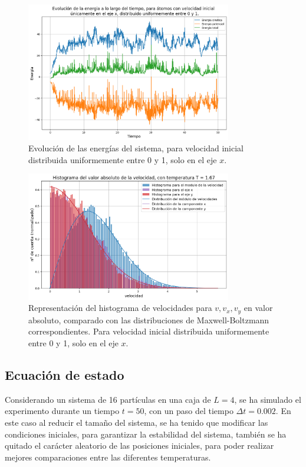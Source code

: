 \documentclass[11pt, twoside]{article} %
\begin{document}
\begin{figure}[h!]
    \centering
    \includegraphics[width=0.8\textwidth]{plots/apartado_2_energia_x.png}
    \caption{Evolución de las energías del sistema, para velocidad inicial distribuida 
    uniformemente entre 0 y 1, solo en el eje $x$.}
    \label{fig:apartado_2_energia_x}
\end{figure}

\begin{figure}[h!]
    \centering
    \includegraphics[width=0.8\textwidth]{plots/histograma_velocidad_x.png}
    \caption{Representación del histograma de velocidades para $v, v_x, v_y$ en valor
    absoluto, comparado con las distribuciones de Maxwell-Boltzmann correspondientes. 
    Para velocidad inicial distribuida uniformemente entre 0 y 1, solo en el eje $x$.}
    \label{fig:histograma_velocidad_x}
\end{figure}

\newpage

\subsection{Ecuación de estado}
Considerando un sistema de 16 partículas en una caja de $L=4$, se ha simulado el
experimento durante un tiempo $t=50$, con un paso del tiempo $\Delta t = 0.002$.
En este caso al reducir el tamaño del sistema, se ha tenido que modificar las condiciones
iniciales, para garantizar la estabilidad del sistema, también se ha quitado el carácter
aleatorio de las posiciones iniciales, para poder realizar mejores comparaciones entre 
las diferentes temperaturas.
\end{document}
